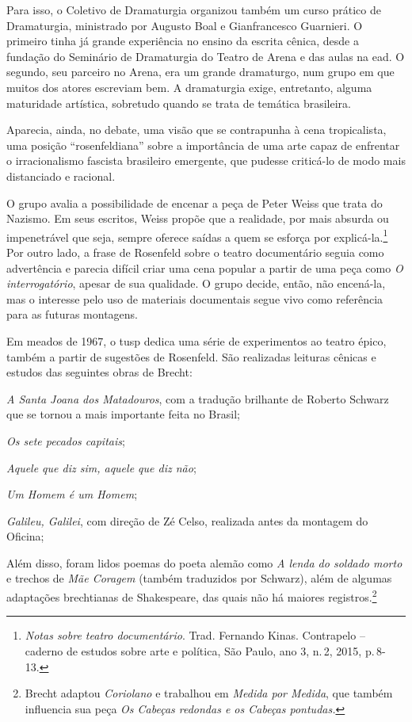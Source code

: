 Para isso, o Coletivo de Dramaturgia organizou também um curso prático
de Dramaturgia, ministrado por Augusto Boal e Gianfrancesco Guarnieri. O
primeiro tinha já grande experiência no ensino da escrita cênica, desde
a fundação do Seminário de Dramaturgia do Teatro de Arena e das aulas na
{\sc ead}. O segundo, seu parceiro no Arena, era um grande dramaturgo, num
grupo em que muitos dos atores escreviam bem. A dramaturgia exige,
entretanto, alguma maturidade artística, sobretudo quando se trata de
temática brasileira.

Aparecia, ainda, no debate, uma visão que se contrapunha à cena
tropicalista, uma posição “rosenfeldiana” sobre a importância de uma
arte capaz de enfrentar o irracionalismo fascista brasileiro emergente,
que pudesse criticá-lo de modo mais distanciado e racional.

O grupo avalia a possibilidade de encenar a peça de Peter Weiss que
trata do Nazismo. Em seus escritos, Weiss propõe que a realidade, por
mais absurda ou impenetrável que seja, sempre oferece saídas a quem se
esforça por explicá-la.\footnote{{\it Notas sobre teatro documentário}.
  Trad. Fernando Kinas. Contrapelo -- caderno de estudos sobre arte e
  política, São Paulo, ano 3, n.\,2, 2015, p.\,8-13.} Por outro lado, a
frase de Rosenfeld sobre o teatro documentário seguia como advertência e
parecia difícil criar uma cena popular a partir de uma peça como {\it O
interrogatório}, apesar de sua qualidade. O grupo decide, então, não
encená-la, mas o interesse pelo uso de materiais documentais segue vivo
como referência para as futuras montagens.

Em meados de 1967, o {\sc tusp} dedica uma série de experimentos ao teatro
épico, também a partir de sugestões de Rosenfeld. São realizadas
leituras cênicas e estudos das seguintes obras de Brecht:

{\it A Santa Joana dos Matadouros}, com a tradução brilhante de Roberto
Schwarz que se tornou a mais importante feita no Brasil;

{\it Os sete pecados capitais};

{\it Aquele que diz sim, aquele que diz não};

{\it Um Homem é um Homem};

{\it Galileu, Galilei}, com direção de Zé Celso, realizada antes da
montagem do Oficina;

Além disso, foram lidos poemas do poeta alemão como {\it A lenda do
soldado morto} e trechos de {\it Mãe Coragem} (também traduzidos por
Schwarz), além de algumas adaptações brechtianas de Shakespeare, das
quais não há maiores registros.\footnote{Brecht adaptou {\it Coriolano}
  e trabalhou em {\it Medida por Medida}, que também influencia sua peça
  {\it Os Cabeças redondas e os Cabeças pontudas.}}

